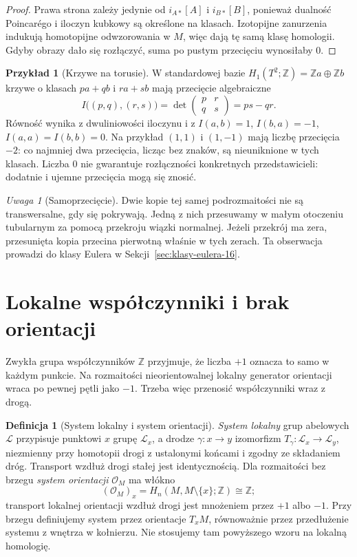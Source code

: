 \documentclass[11pt,a4paper,oneside]{report}
\newcommand{\Z}{\mathbb{Z}}
\theoremstyle{plain}
\theoremstyle{definition}
\newtheorem{definicja}[twierdzenie]{Definicja}
\newtheorem{przyklad}[twierdzenie]{Przykład}
\theoremstyle{remark}
\newtheorem{uwaga}[twierdzenie]{Uwaga}
\begin{document}
\begin{proof}
Prawa strona zależy jedynie
od $i_{A*}[A]$ i $i_{B*}[B]$,
ponieważ dualność Poincarégo
i iloczyn kubkowy są
określone na klasach.
Izotopijne zanurzenia
indukują homotopijne
odwzorowania w $M$,
więc dają tę samą
klasę homologii.
Gdyby obrazy dało się
rozłączyć, suma po
pustym przecięciu
wynosiłaby $0$.
\end{proof}

\begin{przyklad}[Krzywe na torusie]
W standardowej bazie
$H_1(T^2;\Z)=\Z a\oplus\Z b$
krzywe o klasach
$pa+qb$ i $ra+sb$
mają przecięcie algebraiczne
\[
 I\bigl((p,q),(r,s)\bigr)
 =\det\begin{pmatrix}p&r\\q&s\end{pmatrix}
 =ps-qr.
\]
Równość wynika z dwuliniowości
iloczynu i z
$I(a,b)=1$, $I(b,a)=-1$,
$I(a,a)=I(b,b)=0$.
Na przykład $(1,1)$ i $(1,-1)$
mają liczbę przecięcia $-2$:
co najmniej dwa przecięcia,
licząc bez znaków, są
nieuniknione w tych klasach.
Liczba $0$ nie gwarantuje
rozłączności konkretnych
przedstawicieli: dodatnie
i ujemne przecięcia mogą
się znosić.
\end{przyklad}

\begin{uwaga}[Samoprzecięcie]
Dwie kopie tej samej
podrozmaitości nie są
transwersalne, gdy się
pokrywają. Jedną z nich
przesuwamy w małym
otoczeniu tubularnym
za pomocą przekroju
wiązki normalnej.
Jeżeli przekrój ma zera,
przesunięta kopia
przecina pierwotną
właśnie w tych zerach.
Ta obserwacja prowadzi
do klasy Eulera
w Sekcji~\ref{sec:klasy-eulera-16}.
\end{uwaga}

\section{Lokalne współczynniki i brak orientacji}
\label{sec:lokalne-wsp-16}

Zwykła grupa współczynników
$\Z$ przyjmuje, że liczba
$+1$ oznacza to samo w
każdym punkcie. Na rozmaitości
nieorientowalnej lokalny
generator orientacji wraca
po pewnej pętli jako $-1$.
Trzeba więc przenosić
współczynniki wraz z drogą.

\begin{definicja}[System lokalny i system orientacji]
\label{def:system-lokalny-16}
\emph{System lokalny} grup abelowych
$\mathcal L$ przypisuje punktowi
$x$ grupę $\mathcal L_x$,
a drodze $\gamma:x\to y$
izomorfizm
$T_\gamma:\mathcal L_x\to\mathcal L_y$,
niezmienny przy homotopii
drogi z ustalonymi końcami
i zgodny ze składaniem dróg.
Transport wzdłuż drogi stałej jest identycznością.
Dla rozmaitości bez brzegu \emph{system orientacji}
$\mathcal O_M$ ma włókno
\[
 (\mathcal O_M)_x
  =H_n(M,M\setminus\{x\};\Z)
  \cong\Z;
\]
transport lokalnej orientacji
wzdłuż drogi jest mnożeniem
przez $+1$ albo $-1$. Przy brzegu definiujemy
system przez orientacje $T_xM$, równoważnie przez
przedłużenie systemu z wnętrza w kołnierzu.
Nie stosujemy tam powyższego wzoru na lokalną homologię.
\end{definicja}
\end{document}
